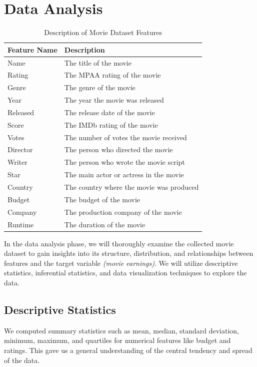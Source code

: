 \documentclass[conference]{IEEEtran}
\begin{document}
\section{Data Analysis}
   \begin{table}[h]
    \centering
    \captionsetup{justification=centering}
    \caption{Description of Movie Dataset Features}
    \label{tab:movie_dataset_features}
    \renewcommand{\arraystretch}{1.5}
        \begin{tabular}{>{\centering\arraybackslash}m{1cm} >{\centering\arraybackslash}m{6cm}}
        \toprule
        \textbf{Feature Name} & \textbf{Description} \\
        \midrule
        Name & The title of the movie \\
        Rating & The MPAA rating of the movie \\
        Genre & The genre of the movie \\
        Year & The year the movie was released \\
        Released & The release date of the movie \\
        Score & The IMDb rating of the movie \\
        Votes & The number of votes the movie received \\
        Director & The person who directed the movie \\
        Writer & The person who wrote the movie script \\
        Star & The main actor or actress in the movie \\
        Country & The country where the movie was produced \\
        Budget & The budget of the movie \\
        Company & The production company of the movie \\
        Runtime & The duration of the movie \\
        \bottomrule
    \end{tabular}
\end{table}

    In the data analysis phase, we will thoroughly examine the collected movie dataset to gain insights into its structure, distribution, and relationships between features and the target variable \textit{(movie earnings)}. We will utilize descriptive statistics, inferential statistics, and data visualization techniques to explore the data.

    \subsection{Descriptive Statistics}
        We computed summary statistics such as mean, median, standard deviation, minimum, maximum, and quartiles for numerical features like budget and ratings. This gave us a general understanding of the central tendency and spread of the data.
\end{document}
